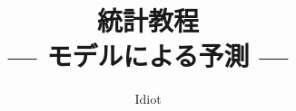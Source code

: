 \documentclass[a4paper,11pt,dvipdfmx]{jsbook}
\begin{document}
\title{統計教程
\large{\\--- モデルによる予測 ---}}
\author{Idiot}
\maketitle
%

%
%
%
%
%
%
%

%


%

%
%
\appendix
%
%
%

\end{document}
